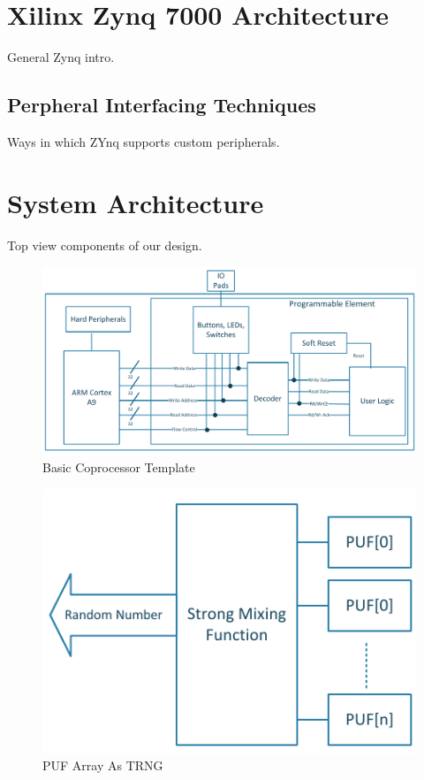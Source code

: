 \documentclass[journal]{IEEEtran}
\begin{document}
\section{Xilinx Zynq 7000 Architecture}

General Zynq intro.

\subsection{Perpheral Interfacing Techniques}

Ways in which ZYnq supports custom peripherals.

\section{System Architecture}

Top view components of our design.

\begin{figure}[!th]
\centering
\includegraphics[scale=.35]{Images/coprocessor-template.pdf}
\caption{ Basic Coprocessor Template}
\label{fig:template}
\end{figure} 


\begin{figure}[!th]
\centering
\includegraphics[scale=.75]{Images/trng.pdf}
\caption{PUF Array As TRNG }
\label{fig:trng}
\end{figure} 
\end{document}
